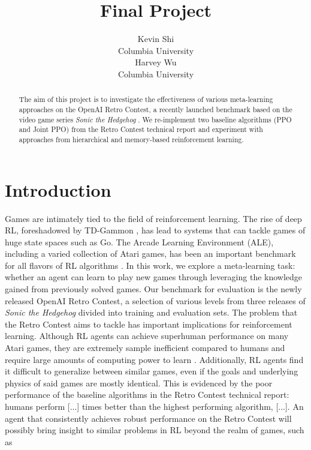 \documentclass{article}
\title{Final Project}
\author{
  Kevin Shi\\
  Columbia University\\
  \And
  Harvey Wu \\
  Columbia University \\
}
\begin{document}

\maketitle

\begin{abstract}
The aim of this project is to investigate the effectiveness of various meta-learning approaches on the OpenAI Retro Contest, a recently launched benchmark based on the video game series \emph{Sonic the Hedgehog} \citep{retro}. We re-implement two baseline algorithms (PPO and Joint PPO) from the Retro Contest technical report and experiment with approaches from hierarchical and memory-based reinforcement learning.
\end{abstract}

\section{Introduction}
Games are intimately tied to the field of reinforcement learning. The rise of deep RL, foreshadowed by TD-Gammon \citep{tesauro}, has lead to systems that can tackle games of huge state spaces such as Go\citep{silver}. The Arcade Learning Environment (ALE), including a varied collection of Atari games, has been an important benchmark for all flavors of RL algorithms \citep{ale}. In this work, we explore a meta-learning task: whether an agent can learn to play new games through leveraging the knowledge gained from previously solved games. Our benchmark for evaluation is the newly released OpenAI Retro Contest, a selection of various levels from three releases of \emph{Sonic the Hedgehog} \citep{retro} divided into training and evaluation sets. The problem that the Retro Contest aims to tackle has important implications for reinforcement learning. Although RL agents can achieve superhuman performance on many Atari games, they are extremely sample inefficient compared to humans and require large amounts of computing power to learn \citep{lake}. Additionally, RL agents find it difficult to generalize between similar games, even if the goals and underlying physics of said games are mostly identical. This is evidenced by the poor performance of the baseline algorithms in the Retro Contest technical report: humans perform [...] times better than the highest performing algorithm, [...]. An agent that consistently achieves robust performance on the Retro Contest will possibly bring insight to similar problems in RL beyond the realm of games, such as
\end{document}
